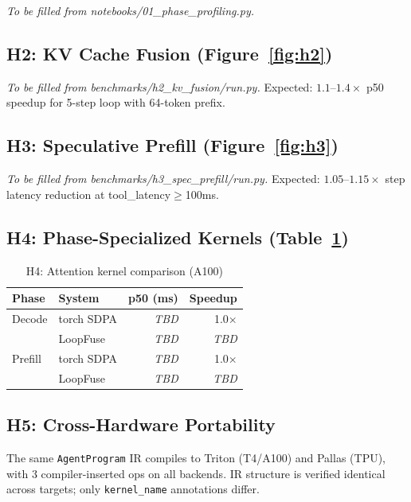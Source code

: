 \documentclass[10pt,twocolumn]{article}
\begin{document}
\textit{To be filled from notebooks/01\_phase\_profiling.py.}

\subsection{H2: KV Cache Fusion (Figure~\ref{fig:h2})}

\textit{To be filled from benchmarks/h2\_kv\_fusion/run.py.}
Expected: $1.1$--$1.4\times$ p50 speedup for 5-step loop with 64-token prefix.

\subsection{H3: Speculative Prefill (Figure~\ref{fig:h3})}

\textit{To be filled from benchmarks/h3\_spec\_prefill/run.py.}
Expected: $1.05$--$1.15\times$ step latency reduction at tool\_latency$\geq$100ms.

\subsection{H4: Phase-Specialized Kernels (Table~\ref{tab:h4})}

\begin{table}[h]
\centering
\small
\caption{H4: Attention kernel comparison (A100)}
\label{tab:h4}
\begin{tabular}{llrr}
\toprule
Phase & System & p50 (ms) & Speedup \\
\midrule
Decode & torch SDPA  & \textit{TBD} & 1.0$\times$ \\
       & LoopFuse    & \textit{TBD} & \textit{TBD} \\
\midrule
Prefill & torch SDPA & \textit{TBD} & 1.0$\times$ \\
        & LoopFuse   & \textit{TBD} & \textit{TBD} \\
\bottomrule
\end{tabular}
\end{table}

\subsection{H5: Cross-Hardware Portability}

The same \texttt{AgentProgram} IR compiles to Triton (T4/A100) and Pallas (TPU),
with 3 compiler-inserted ops on all backends. IR structure is verified identical
across targets; only \texttt{kernel\_name} annotations differ.
\end{document}
